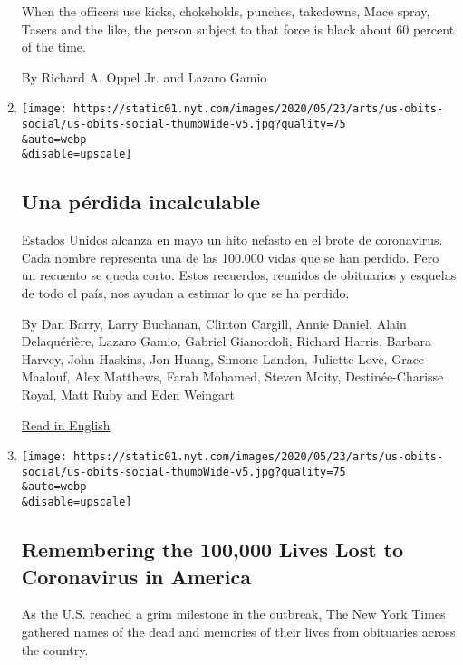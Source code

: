 \begin{enumerate}
  When the officers use kicks, chokeholds, punches, takedowns, Mace
  spray, Tasers and the like, the person subject to that force is black
  about 60 percent of the time.

  By Richard A. Oppel Jr. and Lazaro Gamio
\item
  \href{/es/2020/05/26/espanol/mundo/100000-victimas-covid-estados-unidos.html}{}

  \texttt{[image: https://static01.nyt.com/images/2020/05/23/arts/us-obits-social/us-obits-social-thumbWide-v5.jpg?quality=75\\\&auto=webp\\\&disable=upscale]}

  \hypertarget{una-puxe9rdida-incalculable}{%
  \subsection{Una pérdida
  incalculable}\label{una-puxe9rdida-incalculable}}

  Estados Unidos alcanza en mayo un hito nefasto en el brote de
  coronavirus. Cada nombre representa una de las 100.000 vidas que se
  han perdido. Pero un recuento se queda corto. Estos recuerdos,
  reunidos de obituarios y esquelas de todo el país, nos ayudan a
  estimar lo que se ha perdido.

  By Dan Barry, Larry Buchanan, Clinton Cargill, Annie Daniel, Alain
  Delaquérière, Lazaro Gamio, Gabriel Gianordoli, Richard Harris,
  Barbara Harvey, John Haskins, Jon Huang, Simone Landon, Juliette Love,
  Grace Maalouf, Alex Matthews, Farah Mohamed, Steven Moity,
  Destinée-Charisse Royal, Matt Ruby and Eden Weingart

  \href{https://www.nytimes.com/interactive/2020/05/24/us/us-coronavirus-deaths-100000.html}{Read
  in English}
\item
  \href{/interactive/2020/05/24/us/us-coronavirus-deaths-100000.html}{}

  \texttt{[image: https://static01.nyt.com/images/2020/05/23/arts/us-obits-social/us-obits-social-thumbWide-v5.jpg?quality=75\\\&auto=webp\\\&disable=upscale]}

  \hypertarget{remembering-the-100000-lives-lost-to-coronavirus-in-america}{%
  \subsection{Remembering the 100,000 Lives Lost to Coronavirus in
  America}\label{remembering-the-100000-lives-lost-to-coronavirus-in-america}}

  As the U.S. reached a grim milestone in the outbreak, The New York
  Times gathered names of the dead and memories of their lives from
  obituaries across the country.


\end{enumerate}
